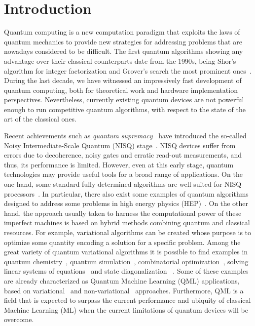 \documentclass[twocolumn,preprintnumbers,superscriptaddress]{revtex4-2}
\begin{document}
\section{Introduction}

Quantum computing is a new computation paradigm that exploits the laws of
quantum mechanics to provide new strategies for addressing problems that are
nowadays considered to be difficult. The first quantum algorithms showing any
advantage over their classical counterparts date from the 1990s, being Shor's
algorithm for integer factorization and Grover's search the most prominent
ones~\cite{shor,grover}. During the last decade, we have witnessed an
impressively fast development of quantum computing, both for theoretical work
and hardware implementation perspectives. Nevertheless, currently existing
quantum devices are not powerful enough to run competitive quantum algorithms,
with respect to the state of the art of the classical ones.

Recent achievements such as {\sl quantum supremacy}~\cite{supremacy} have
introduced the so-called Noisy Intermediate-Scale Quantum (NISQ)
stage~\cite{nisq}. NISQ devices suffer from errors due to decoherence, noisy
gates and erratic read-out measurements, and thus, its performance is limited.
However, even at this early stage, quantum technologies may provide useful tools
for a broad range of applications. On the one hand, some standard fully
determined algorithms are well suited for NISQ
processors~\cite{cerveralierta:2018ising,suba:2019spectroscopy,bravyi:2018shallow,Bravyi:2020noisyshallow,ramoscalderer:2020unary}.
In particular, there also exist some examples of quantum algorithms designed to
address some problems in high energy physics
(HEP)~\cite{Perez-Salinas:2020nem,hep_amplitudes-bepari2020, hep_simulation-bauer2019,
hep_gluon-alexandru2019, hep_parton-lamm2020}. On the other hand, the approach
usually taken to harness the computational power of these imperfect machines is
based on hybrid methods combining quantum and classical resources. For example,
variational algorithms can be created whose purpose is to optimize some quantity
encoding a solution for a specific problem. Among the great variety of quantum
variational algorithms it is possible to find examples in quantum
chemistry~\cite{peruzzo:2014vqe,higgott:2019vqe,aspuru:2005molecular,hempel:2018chemistry,jones:2019vqe},
quantum
simulation~\cite{li:2017simulation,kokail:2019simulation,cirstoiu:2020simulation},
combinatorial optimization~\cite{farhi:2014qoao}, solving linear systems of
equations~\cite{bravoprieto:2020linear,xu:2019linear,huang:2019linear} and state
diagonalization
~\cite{LaRose:2019diagonalization,BravoPrieto:2020diagonalization}. Some of
these examples are already characterized as Quantum Machine Learning (QML)
applications, based on variational~\cite{perezsalinas:2020reuploading,
mitarai:2018circuit,Zhu:2019circuit,Schuld:2020circuit,lloyd:2020embeddings} and
non-variational~\cite{liu:2020svm,Rebentrost:2014svm,lloyd:2013ml} approaches.
Furthermore, QML is a field that is expected to surpass the current performance
and ubiquity of classical Machine Learning (ML) when the current limitations of
quantum devices will be overcome.
\end{document}
